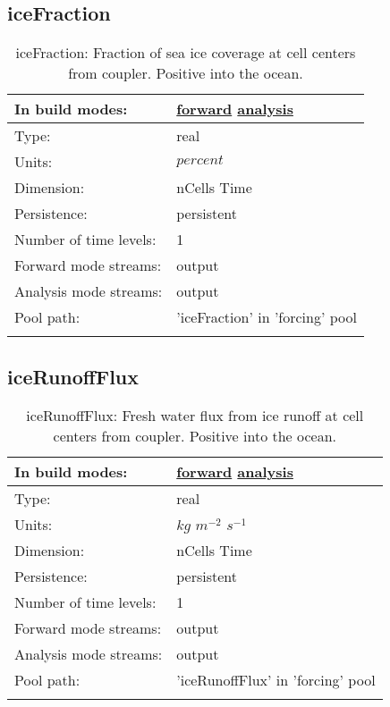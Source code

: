 \subsection[iceFraction]{iceFraction}
\label{subsec:var_sec_forcing_iceFraction}
\begin{center}
\begin{longtable}{| p{2.0in} | p{4.0in} |}
        \hline 
        In build modes: & \hyperref[subsec:forward_var_tab_forcing]{forward} \hyperref[subsec:analysis_var_tab_forcing]{analysis} \\
        \hline 
        Type: & real \\
        \hline 
        Units: & $percent$ \\
        \hline 
        Dimension: & nCells Time \\
        \hline 
        Persistence: & persistent \\
        \hline 
        Number of time levels: & 1 \\
        \hline 
		 Forward mode streams: &  output \\
        \hline 
		 Analysis mode streams: &  output \\
        \hline 
            Pool path: & 'iceFraction' in 'forcing' pool
 \\
		 \hline 
    \caption{iceFraction: Fraction of sea ice coverage at cell centers from coupler. Positive into the ocean.}
\end{longtable}
\end{center}
\subsection[iceRunoffFlux]{iceRunoffFlux}
\label{subsec:var_sec_forcing_iceRunoffFlux}
\begin{center}
\begin{longtable}{| p{2.0in} | p{4.0in} |}
        \hline 
        In build modes: & \hyperref[subsec:forward_var_tab_forcing]{forward} \hyperref[subsec:analysis_var_tab_forcing]{analysis} \\
        \hline 
        Type: & real \\
        \hline 
        Units: & $kg$ $m^{-2}$ $s^{-1}$ \\
        \hline 
        Dimension: & nCells Time \\
        \hline 
        Persistence: & persistent \\
        \hline 
        Number of time levels: & 1 \\
        \hline 
		 Forward mode streams: &  output \\
        \hline 
		 Analysis mode streams: &  output \\
        \hline 
            Pool path: & 'iceRunoffFlux' in 'forcing' pool
 \\
		 \hline 
    \caption{iceRunoffFlux: Fresh water flux from ice runoff at cell centers from coupler. Positive into the ocean.}
\end{longtable}
\end{center}
